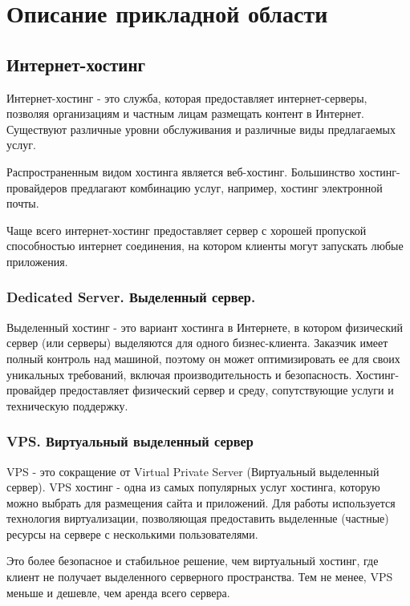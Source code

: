 \chapter{Описание прикладной области}\label{ch:ch1}

\section{Интернет-хостинг}\label{sec:ch1/sec1}
Интернет-хостинг - это служба, которая предоставляет интернет-серверы, позволяя организациям и частным лицам размещать контент в Интернет. Существуют различные уровни обслуживания и различные виды предлагаемых услуг.

Распространенным видом хостинга является веб-хостинг. Большинство хостинг-провайдеров предлагают комбинацию услуг, например, хостинг электронной почты.

Чаще всего интернет-хостинг предоставляет сервер с хорошей пропуской способностью интернет соединения, на котором клиенты могут запускать любые приложения.

\subsection{Dedicated Server. Выделенный сервер.}\label{sec:ds_hosting}
Выделенный хостинг - это вариант хостинга в Интернете, в котором физический сервер (или серверы) выделяются для одного бизнес-клиента. Заказчик имеет полный контроль над машиной, поэтому он может оптимизировать ее для своих уникальных требований, включая производительность и безопасность. Хостинг-провайдер предоставляет физический сервер и среду, сопутствующие услуги и техническую поддержку.

\subsection{VPS. Виртуальный выделенный сервер}\label{sec:vps_hosting}
VPS - это сокращение от Virtual Private Server (Виртуальный выделенный сервер). VPS хостинг - одна из самых популярных услуг хостинга, которую можно выбрать для размещения сайта и приложений. Для работы используется технология виртуализации, позволяющая предоставить выделенные (частные) ресурсы на сервере с несколькими пользователями.

Это более безопасное и стабильное решение, чем виртуальный хостинг, где клиент не получает выделенного серверного пространства. Тем не менее, VPS меньше и дешевле, чем аренда всего сервера.

